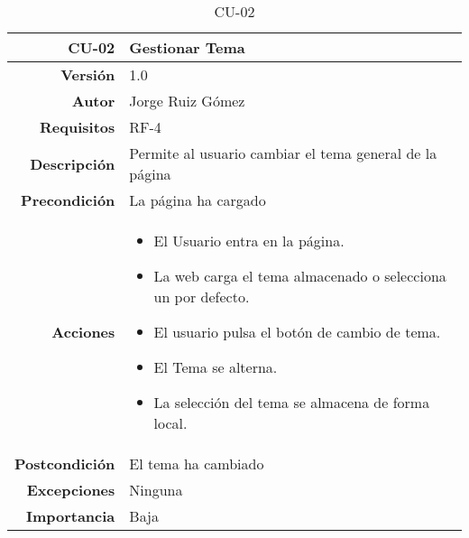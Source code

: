 \begin{table}[]
\centering
\begin{tabular}{r|p{}}
\hline
\textbf{CU-02}         & \textbf{Gestionar Tema}                                 \\ \hline
\textbf{Versión}       & 1.0                                                     \\
\textbf{Autor}         & Jorge Ruiz Gómez                                        \\
\textbf{Requisitos}    & RF-4                                         \\
\textbf{Descripción}   & Permite al usuario cambiar el tema general de la página \\ \hline
\textbf{Precondición}  & La página ha cargado                                                 \\
\textbf{Acciones}      &    \begin{itemize}
                                \item El Usuario entra en la página.
                                \item La web carga el tema almacenado o selecciona un por defecto.
                                \item El usuario pulsa el botón de cambio de tema.
                                \item El Tema se alterna.
                                \item La selección del tema se almacena de forma local.
                            \end{itemize}\\
                                                                          
\textbf{Postcondición} & El tema ha cambiado                                     \\
\textbf{Excepciones}   & Ninguna                                                 \\
\textbf{Importancia}   & Baja                                                    \\ \hline
\end{tabular}
\caption{CU-02}
\label{tab:my-table}
\end{table}









